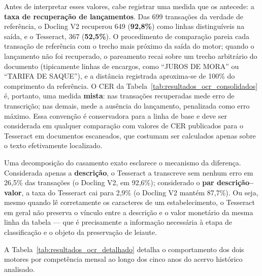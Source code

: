 Antes de interpretar esses valores, cabe registrar uma medida que os antecede: a \textbf{taxa de recuperação de lançamentos}. Das 699 transações da verdade de referência, o Docling V2 recuperou 649 (\textbf{92,8\%}) como linhas distinguíveis na saída, e o Tesseract, 367 (\textbf{52,5\%}). O procedimento de comparação pareia cada transação de referência com o trecho mais próximo da saída do motor; quando o lançamento não foi recuperado, o pareamento recai sobre um trecho arbitrário do documento (tipicamente linhas de encargos, como ``JUROS DE MORA'' ou ``TARIFA DE SAQUE''), e a distância registrada aproxima-se de 100\% do comprimento da referência. O CER da Tabela~\ref{tab:resultados_ocr_consolidados} é, portanto, uma medida \textbf{mista}: nas transações recuperadas mede erro de transcrição; nas demais, mede a ausência do lançamento, penalizada como erro máximo. Essa convenção é conservadora para a linha de base e deve ser considerada em qualquer comparação com valores de CER publicados para o Tesseract em documentos escaneados, que costumam ser calculados apenas sobre o texto efetivamente localizado.

Uma decomposição do casamento exato esclarece o mecanismo da diferença. Considerada apenas a \textbf{descrição}, o Tesseract a transcreve sem nenhum erro em 26,5\% das transações (o Docling V2, em 92,6\%); considerado o \textbf{par descrição--valor}, a taxa do Tesseract cai para 2,9\% (o Docling V2 mantém 87,7\%). Ou seja, mesmo quando lê corretamente os caracteres de um estabelecimento, o Tesseract em geral não preserva o vínculo entre a descrição e o valor monetário da mesma linha da tabela --- que é precisamente a informação necessária à etapa de classificação e o objeto da preservação de leiaute.

A Tabela~\ref{tab:resultados_ocr_detalhado} detalha o comportamento dos dois motores por competência mensal ao longo dos cinco anos do acervo histórico analisado.

